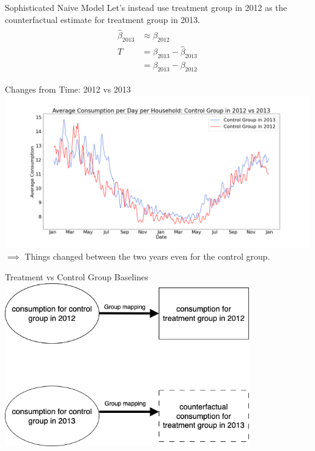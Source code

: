 \documentclass{beamer}
\begin{document}
\begin{frame}{Sophisticated Naive Model}
  Let's instead use treatment group in 2012 as the counterfactual estimate for treatment group in 2013.
  \begin{align*}
    \begin{split}
      \hat\beta_{2013} & \approx \beta_{2012} \\
      T & = \beta_{2013} - \hat\beta_{2013} \\
        & = \beta_{2013} - \beta_{2012}
    \end{split}
  \end{align*}
\end{frame}

\begin{frame}{Changes from Time: 2012 vs 2013}
  \centering
  \includegraphics[width=1\textwidth]{images/yoy-changes-control-group.png}
  $\implies$ Things changed between the two years even for the control group.
\end{frame}

\begin{frame}{Treatment vs Control Group Baselines}
  \centering
  \includegraphics[width=0.8\textwidth]{images/group-mapping.png}
\end{frame}
\end{document}
